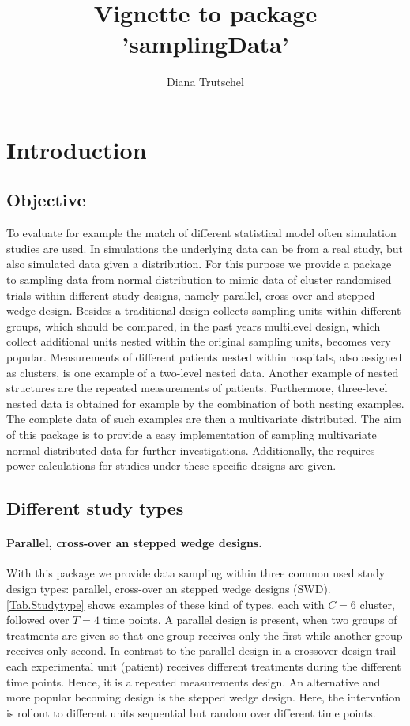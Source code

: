 \documentclass{article}
\title{Vignette to package 'samplingData'}
\author{Diana Trutschel}
\begin{document}
\maketitle
\tableofcontents

\section{Introduction}

\subsection{Objective}

To evaluate for example the match of different statistical model often simulation studies are used. 
In simulations the underlying data can be from a real study, but also simulated data given a distribution. 
For this purpose we provide a package to sampling data from normal distribution to mimic data of cluster randomised trials within different study designs, namely parallel, cross-over and stepped wedge design.
Besides a traditional design collects sampling units within different groups, which should be compared, in the past years multilevel design, which collect additional units nested within the original sampling units, becomes very popular. Measurements of different patients nested within hospitals, also assigned as clusters, is one example of a two-level nested data. Another example of nested structures are the repeated measurements of patients. Furthermore, three-level nested data is obtained for example by the  combination of both nesting examples. The complete data of such examples are then a multivariate distributed. The aim of this package is to provide a easy implementation of sampling multivariate normal distributed data for further investigations. Additionally, the requires power calculations for studies under these specific designs are given.

\subsection{Different study types}

\paragraph{Parallel, cross-over an stepped wedge designs.}

With this package we provide data sampling within three common used study design types: parallel, cross-over an stepped wedge designs (SWD). \ref{Tab.Studytype} shows examples of these kind of types, each with  $C=6$ cluster, followed over $T=4$ time points.
A parallel design is present, when two groups of treatments are given so that one group receives only the first while another group receives only second.
In contrast to the parallel design in a crossover design trail each experimental unit (patient) receives different treatments during the different time points.
Hence, it is a repeated measurements design. 
An alternative and more popular becoming design is the stepped wedge design. Here, the intervntion is rollout to different units sequential but random over different time points.
\end{document}
